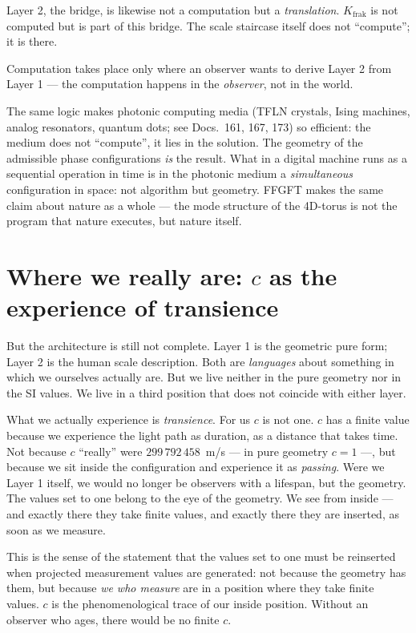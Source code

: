 Layer 2, the bridge, is likewise not a computation but a
\emph{translation}. $K_{\mathrm{frak}}$ is not computed but is part
of this bridge. The scale staircase
itself does not ``compute''; it is there.

Computation takes place only where an observer wants to derive Layer 2
from Layer 1 --- the computation happens in the \emph{observer}, not
in the world.

The same logic makes photonic computing media (TFLN crystals, Ising
machines, analog resonators, quantum dots; see Docs.~161, 167, 173)
so efficient: the medium does not ``compute'', it lies in the
solution. The geometry of the admissible phase configurations
\emph{is} the result. What in a digital machine runs as a sequential
operation in time is in the photonic medium a \emph{simultaneous}
configuration in space: not algorithm but geometry. FFGFT makes the
same claim about nature as a whole --- the mode structure of the
4D-torus is not the program that nature executes, but nature itself.

\section{Where we really are: $c$ as the experience of transience}

But the architecture is still not complete. Layer 1 is the geometric
pure form; Layer 2 is the human scale description. Both are
\emph{languages} about something in which we ourselves actually are.
But we live neither in the pure geometry nor in the SI values. We
live in a third position that does not coincide with either layer.

What we actually experience is \emph{transience}. For us $c$ is not
one. $c$ has a finite value because we experience the light path as
duration, as a distance that takes time. Not because $c$ ``really''
were $299\,792\,458$~m/s --- in pure geometry $c = 1$ ---, but
because we sit inside the configuration and experience it as
\emph{passing}. Were we Layer 1 itself, we would no longer be
observers with a lifespan, but the geometry. The values set to one
belong to the eye of the geometry. We see from inside --- and
exactly there they take finite values, and exactly there they are
inserted, as soon as we measure.

This is the sense of the statement that the values set to one must be
reinserted when projected measurement values are generated: not
because the geometry has them, but because \emph{we who measure} are
in a position where they take finite values. $c$ is the
phenomenological trace of our inside position. Without an observer
who ages, there would be no finite $c$.

